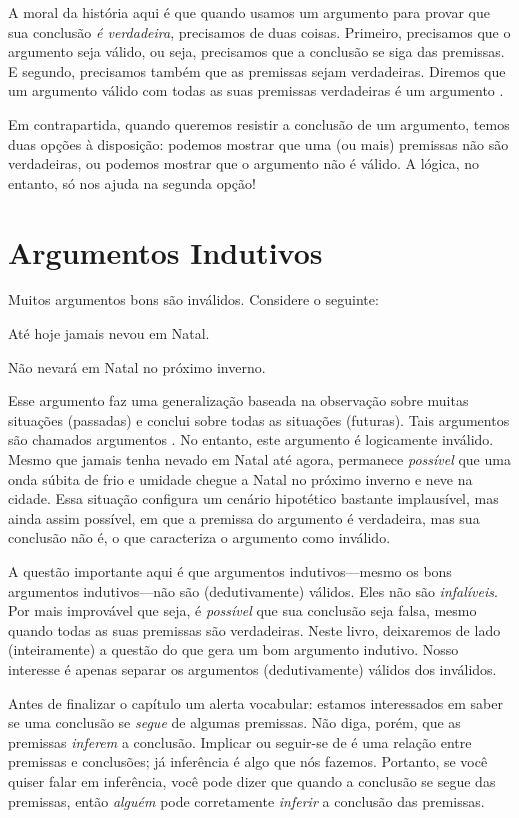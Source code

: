 A moral da história aqui é que quando usamos um argumento para provar que sua conclusão \emph{é verdadeira}, precisamos de duas coisas.
Primeiro, precisamos que o argumento seja válido, ou seja, precisamos que a conclusão se siga das premissas.
E segundo, precisamos também que as premissas sejam verdadeiras.
Diremos que um argumento válido com todas as suas premissas verdadeiras é um argumento .

Em contrapartida, quando queremos resistir a conclusão de um argumento, temos duas opções à disposição: podemos mostrar que uma (ou mais) premissas não são verdadeiras, ou podemos mostrar que o argumento não é válido.
A lógica, no entanto, só nos ajuda na segunda opção!


\section{Argumentos Indutivos}

Muitos argumentos bons são inválidos. Considere o seguinte:
	\begin{earg}
		\item[] Até hoje jamais nevou em Natal.
	\item[\therefore] Não nevará em Natal no próximo inverno.
\end{earg}
Esse argumento faz uma generalização baseada na observação sobre muitas situações (passadas) e conclui sobre todas as situações (futuras).
Tais argumentos são chamados argumentos .
No entanto, este argumento é logicamente inválido.
Mesmo que jamais tenha nevado em Natal até agora, permanece \emph{possível} que 
uma onda súbita de frio e umidade chegue a Natal no próximo inverno e neve na cidade.
Essa situação configura um cenário hipotético bastante implausível, mas ainda assim possível, em que a premissa do argumento é verdadeira, mas sua conclusão não é, o que caracteriza o argumento como inválido.

A questão importante aqui é que argumentos indutivos---mesmo os bons argumentos indutivos---não são (dedutivamente) válidos.
Eles não são \emph{infalíveis}.
Por mais improvável que seja, é \emph{possível} que sua conclusão seja falsa, mesmo quando todas as suas premissas são verdadeiras.
Neste livro, deixaremos de lado (inteiramente) a questão do que gera um bom argumento indutivo.
Nosso interesse é apenas separar os argumentos (dedutivamente) válidos dos inválidos.

Antes de finalizar o capítulo um alerta vocabular: estamos interessados em saber se uma conclusão se \emph{segue} de algumas premissas.
Não diga, porém, que as premissas \emph{inferem} a conclusão.
Implicar ou seguir-se de é uma relação entre premissas e conclusões; já inferência é algo que nós fazemos.
Portanto, se você quiser falar em inferência, você pode dizer que quando a conclusão se segue das premissas, então \emph{alguém} pode corretamente \emph{inferir} a conclusão das premissas.


